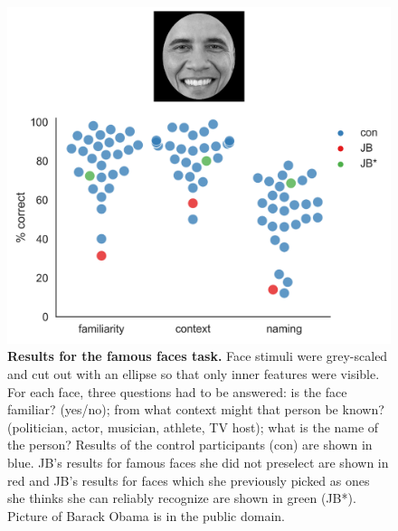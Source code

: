 \documentclass[fleqn,10pt]{SelfArx} %
\begin{document}
\begin{figure}[htbp]
	
	\renewcommand{\familydefault}{\sfdefault}\normalfont
	\centering
	\includegraphics[width=\columnwidth]{../reports/figures/famface_main_figure.png}
	\vspace*{-3mm}
	\caption{\textbf{Results for the famous faces task.} Face stimuli were grey-scaled and cut out with an ellipse so that only inner features were visible. For each face, three questions had to be answered: is the face familiar? (yes/no); from what context might that person be known? (politician, actor, musician, athlete, TV host); what is the name of the person? Results of the control participants (con) are shown in blue. JB's results for famous faces she did not preselect are shown in red and JB's results for faces which she previously picked as ones she thinks she can reliably recognize are shown in green (JB*). Picture of Barack Obama is in the public domain.}%
	\label{fig:famous}
	
\end{figure}
\end{document}
